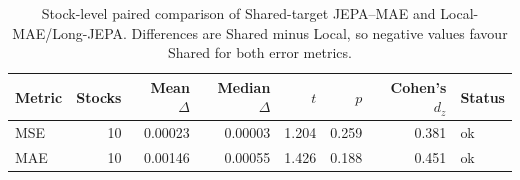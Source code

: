 \begin{table}[t]
\centering
\small
\caption{Stock-level paired comparison of Shared-target JEPA--MAE and Local-MAE/Long-JEPA. Differences are Shared minus Local, so negative values favour Shared for both error metrics.}
\label{tab:shared_vs_local}
\begin{tabular}{lrrrrrrl}
\toprule
Metric & Stocks & Mean $\Delta$ & Median $\Delta$ & $t$ & $p$ & Cohen's $d_z$ & Status \\
\midrule
MSE & 10 & 0.00023 & 0.00003 & 1.204 & 0.259 & 0.381 & ok \\
MAE & 10 & 0.00146 & 0.00055 & 1.426 & 0.188 & 0.451 & ok \\
\bottomrule
\end{tabular}
\end{table}
